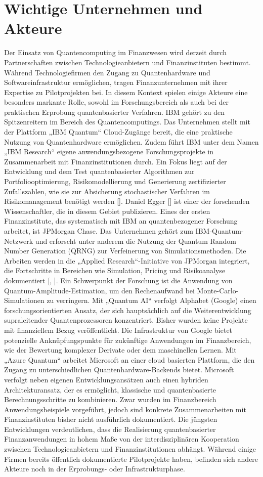 \section{Wichtige Unternehmen und Akteure}
Der Einsatz von Quantencomputing im Finanzwesen wird derzeit durch Partnerschaften zwischen Technologieanbietern und Finanzinstituten bestimmt. Während Technologiefirmen den Zugang zu Quantenhardware und Softwareinfrastruktur ermöglichen, tragen Finanzunternehmen mit ihrer Expertise zu Pilotprojekten bei. In diesem Kontext spielen einige Akteure eine besonders markante Rolle, sowohl im Forschungsbereich als auch bei der praktischen Erprobung quantenbasierter Verfahren.
IBM gehört zu den Spitzenreitern im Bereich des Quantencomputings. Das Unternehmen stellt mit der Plattform „IBM Quantum“ Cloud-Zugänge bereit, die eine praktische Nutzung von Quantenhardware ermöglichen. Zudem führt IBM unter dem Namen „IBM Research“ eigene anwendungsbezogene Forschungsprojekte in Zusammenarbeit mit Finanzinstitutionen durch. Ein Fokus liegt auf der Entwicklung und dem Test quantenbasierter Algorithmen zur Portfoliooptimierung, Risikomodellierung und Generierung zertifizierter Zufallszahlen, wie sie zur Absicherung stochastischer Verfahren im Risikomanagement benötigt werden [\cite{jpmorgan_certified}]. Daniel Egger [\cite{ibm_egger}] ist einer der forschenden Wissenschaftler, die in diesem Gebiet publizieren.
Eines der ersten Finanzinstitute, das systematisch mit IBM an quantenbezogener Forschung arbeitet, ist JPMorgan Chase. Das Unternehmen gehört zum IBM-Quantum-Netzwerk und erforscht unter anderem die Nutzung der Quantum Random Number Generation (QRNG) zur Verfeinerung von Simulationsmethoden. Die Arbeiten werden in die „Applied Research“-Initiative von JPMorgan integriert, die Fortschritte in Bereichen wie Simulation, Pricing und Risikoanalyse dokumentiert [\cite{jpmorgan_certified}, \cite{jpmorgan_applied}]. Ein Schwerpunkt der Forschung ist die Anwendung von Quantum-Amplitude-Estimation, um den Rechenaufwand bei Monte-Carlo-Simulationen zu verringern.
Mit „Quantum AI“ verfolgt Alphabet (Google) einen forschungsorientierten Ansatz, der sich hauptsächlich auf die Weiterentwicklung supraleitender Quantenprozessoren konzentriert. Bisher wurden keine Projekte mit finanziellem Bezug veröffentlicht. Die Infrastruktur von Google bietet potenzielle Anknüpfungspunkte für zukünftige Anwendungen im Finanzbereich, wie der Bewertung komplexer Derivate oder dem maschinellen Lernen.
Mit „Azure Quantum“ arbeitet Microsoft an einer cloud basierten Plattform, die den Zugang zu unterschiedlichen Quantenhardware-Backends bietet. Microsoft verfolgt neben eigenen Entwicklungsansätzen auch einen hybriden Architekturansatz, der es ermöglicht, klassische und quantenbasierte Berechnungsschritte zu kombinieren. Zwar wurden im Finanzbereich Anwendungsbeispiele vorgeführt, jedoch sind konkrete Zusammenarbeiten mit Finanzinstituten bisher nicht ausführlich dokumentiert.
Die jüngsten Entwicklungen verdeutlichen, dass die Realisierung quantenbasierter Finanzanwendungen in hohem Maße von der interdisziplinären Kooperation zwischen Technologieanbietern und Finanzinstitutionen abhängt. Während einige Firmen bereits öffentlich dokumentierte Pilotprojekte haben, befinden sich andere Akteure noch in der Erprobungs- oder Infrastrukturphase.


